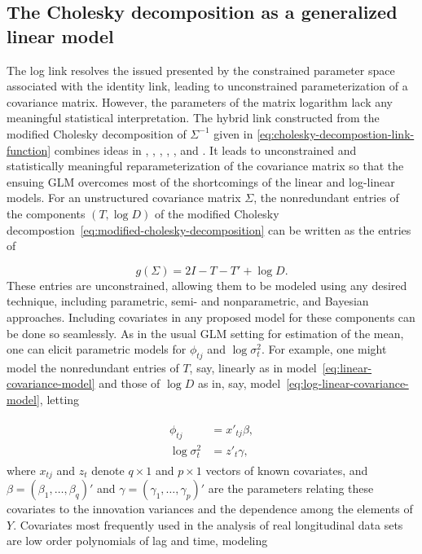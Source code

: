 \subsection{The Cholesky decomposition as a generalized linear model}

The log link resolves the issued presented by the constrained parameter space associated with the identity link, leading to unconstrained parameterization of a covariance matrix. However, the parameters of the matrix logarithm lack any meaningful statistical interpretation. The hybrid link  constructed from the modified Cholesky decomposition of $\Sigma^{-1}$ given in \ref{eq:cholesky-decompostion-link-function} combines ideas in \cite{edgeworth1892xxii}, \cite{gabriel1962ante}, \cite{anderson1973asymptotically}, \cite{dempster1972covariance}, \cite{chiu1996matrix}, and \cite{zimmerman1997structured}. It leads to unconstrained and statistically meaningful reparameterization of the covariance matrix so that the ensuing GLM overcomes most of the shortcomings of the linear and log-linear models.  For an unstructured covariance matrix $\Sigma$, the nonredundant entries of the components $\left(T, \log D\right)$ of the modified Cholesky decompostion~\ref{eq:modified-cholesky-decomposition} can be written as the entries of 

\begin{equation}\label{eq:cholesky-decompostion-link-function}
g\left( \Sigma \right) = 2I - T - T' + \log D.
\end{equation}
\noindent
These entries are unconstrained, allowing them to be modeled using any desired technique, including parametric, semi- and nonparametric, and Bayesian approaches. Including covariates in any proposed model for these components can be done so seamlessly. As in the usual GLM setting for estimation of the mean, one can elicit parametric models for $\phi_{tj}$ and $\log\sigma_t^2$.  For example, one might model the nonredundant entries of $T$, say, linearly as in model~\ref{eq:linear-covariance-model} and those of $\log D$ as in, say, model~\ref{eq:log-linear-covariance-model}, letting

\begin{align}
\begin{split} \label{eq:linear-models-for-GARPs-IVs}
\phi_{tj} &= x'_{tj} \beta,\\
\log\sigma_t^2 &= z'_t \gamma,
\end{split}
\end{align}
\noindent
where $x_{tj}$ and $z_{t}$ denote $q \times 1$ and $p \times 1$ vectors of known covariates, and $\beta = \left(\beta_1,\dots, \beta_q \right)'$ and $\gamma = \left(\gamma_1,\dots, \gamma_p \right)'$ are the parameters relating these covariates to the innovation variances and the dependence among the elements of $Y$. Covariates most frequently used in the analysis of real longitudinal data sets are low order polynomials of lag and time, modeling

